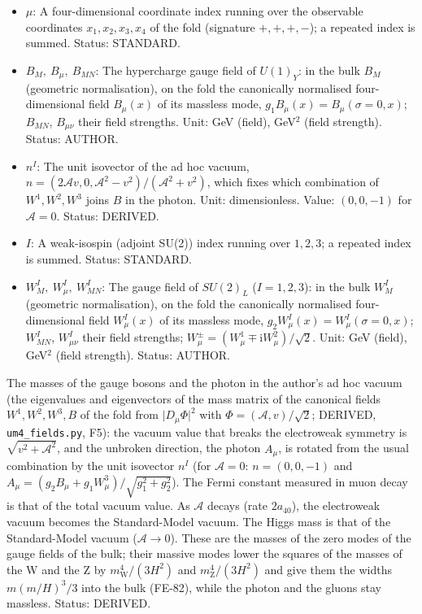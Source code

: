\documentclass[
  10pt,
]{article}
\begin{document}
\begin{itemize}
  \(B\) that the Higgs vacuum leaves massless; a field of the bulk whose
  zero mode travels at the speed of light. Unit: GeV. Status: STANDARD.
\item
  \(\mu\): A four-dimensional coordinate index running over the
  observable coordinates \(x_1, x_2, x_3, x_4\) of the fold (signature
  \(+,+,+,-\)); a repeated index is summed. Status: STANDARD.
\item
  \(B_M,\ B_\mu,\ B_{MN}\): The hypercharge gauge field of \(U(1)_Y\):
  in the bulk \(B_M\) (geometric normalisation), on the fold the
  canonically normalised four-dimensional field \(B_\mu(x)\) of its
  massless mode, \(g_1B_\mu(x) = B_\mu(\sigma = 0, x)\); \(B_{MN}\),
  \(B_{\mu\nu}\) their field strengths. Unit: GeV (field), GeV\(^2\)
  (field strength). Status: AUTHOR.
\item
  \(n^I\): The unit isovector of the ad hoc vacuum,
  \(n = (2\mathcal{A}v, 0, \mathcal{A}^2 - v^2)/(\mathcal{A}^2 + v^2)\),
  which fixes which combination of \(W^1, W^2, W^3\) joins \(B\) in the
  photon. Unit: dimensionless. Value: \((0, 0, -1)\) for
  \(\mathcal{A} = 0\). Status: DERIVED.
\item
  \(I\): A weak-isospin (adjoint SU(2)) index running over \(1, 2, 3\);
  a repeated index is summed. Status: STANDARD.
\item
  \(W^I_M,\ W^I_\mu,\ W^I_{MN}\): The gauge field of \(SU(2)_L\)
  (\(I = 1, 2, 3\)): in the bulk \(W^I_M\) (geometric normalisation), on
  the fold the canonically normalised four-dimensional field
  \(W^I_\mu(x)\) of its massless mode,
  \(g_2W^I_\mu(x) = W^I_\mu(\sigma = 0, x)\); \(W^I_{MN}\),
  \(W^I_{\mu\nu}\) their field strengths;
  \(W^\pm_\mu = (W^1_\mu \mp \mathrm{i}W^2_\mu)/\sqrt2\). Unit: GeV
  (field), GeV\(^2\) (field strength). Status: AUTHOR.
\end{itemize}

The masses of the gauge bosons and the photon in the author's ad hoc
vacuum (the eigenvalues and eigenvectors of the mass matrix of the
canonical fields \(W^1, W^2, W^3, B\) of the fold from
\(\lvert D_\mu\Phi\rvert^2\) with \(\Phi = (\mathcal{A}, v)/\sqrt2\);
DERIVED, \texttt{um4\_fields.py}, F5): the vacuum value that breaks the
electroweak symmetry is \(\sqrt{v^2 + \mathcal{A}^2}\), and the unbroken
direction, the photon \(A_\mu\), is rotated from the usual combination
by the unit isovector \(n^I\) (for \(\mathcal{A} = 0\):
\(n = (0, 0, -1)\) and
\(A_\mu = (g_2B_\mu + g_1W^3_\mu)/\sqrt{g_1^2 + g_2^2}\)). The Fermi
constant measured in muon decay is that of the total vacuum value. As
\(\mathcal{A}\) decays (rate \(2a_{40}\)), the electroweak vacuum
becomes the Standard-Model vacuum. The Higgs mass is that of the
Standard-Model vacuum (\(\mathcal{A} \to 0\)). These are the masses of
the zero modes of the gauge fields of the bulk; their massive modes
lower the squares of the masses of the W and the Z by
\(m_{\mathrm{W}}^4/(3H^2)\) and \(m_{\mathrm{Z}}^4/(3H^2)\) and give
them the widths \(m(m/H)^3/3\) into the bulk (FE-82), while the photon
and the gluons stay massless. Status: DERIVED.
\end{document}
